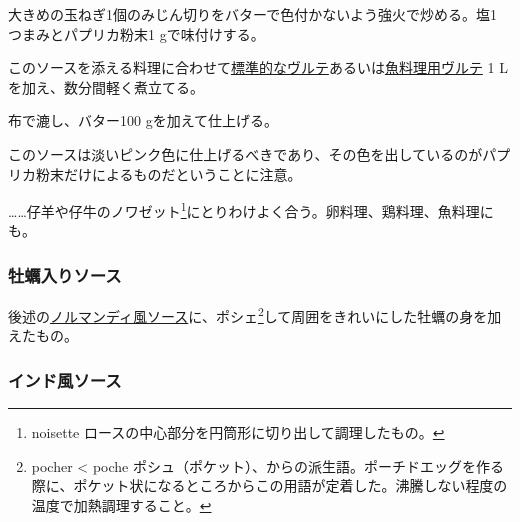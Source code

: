 \begin{recette}


大きめの玉ねぎ1個のみじん切りをバターで色付かないよう強火で炒める。塩1
つまみとパプリカ粉末1 gで味付けする。

このソースを添える料理に合わせて\protect\hyperlink{veloute}{標準的なヴルテ}あるいは\protect\hyperlink{veloute-de-poisson}{魚料理用ヴルテ}
1 Lを加え、数分間軽く煮立てる。

布で漉し、バター100 gを加えて仕上げる。

このソースは淡いピンク色に仕上げるべきであり、その色を出しているのがパプリカ粉末だけによるものだということに注意。

\ldots{}\ldots{}仔羊や仔牛のノワゼット\footnote{noisette
  ロースの中心部分を円筒形に切り出して調理したもの。}にとりわけよく合う。卵料理、鶏料理、魚料理にも。

\hypertarget{sauce-aux-huitres}{%
\subsubsection{牡蠣入りソース}\label{sauce-aux-huitres}}



後述の\protect\hyperlink{sauce-normande}{ノルマンディ風ソース}に、ポシェ\footnote{pocher
  \textless{} poche
  ポシュ（ポケット）、からの派生語。ポーチドエッグを作る際に、ポケット状になるところからこの用語が定着した。沸騰しない程度の温度で加熱調理すること。}して周囲をきれいにした牡蠣の身を加えたもの。

\hypertarget{sauceindienne}{%
\subsubsection{インド風ソース}\label{sauceindienne}}


\end{recette}
